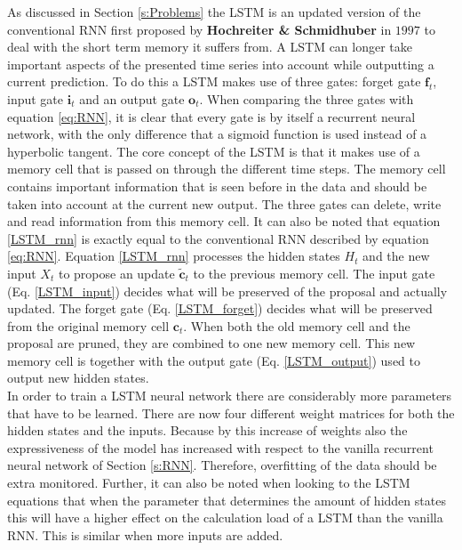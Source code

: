 As discussed in Section \ref{s:Problems} the LSTM is an updated version of the conventional RNN first proposed by \textbf{Hochreiter \& Schmidhuber} in $ 1997 $ to deal with the short term memory it suffers from. A LSTM can longer take important aspects of the presented time series into account while outputting a current prediction. To do this a LSTM makes use of three gates: forget gate $ \textbf{f}_t $, input gate $ \textbf{i}_t $ and an output gate $ \textbf{o}_t $. When comparing the three gates with equation \ref{eq:RNN}, it is clear that every gate is by itself a recurrent neural network, with the only difference that a sigmoid function is used instead of a hyperbolic tangent. The core concept of the LSTM is that it makes use of a memory cell that is passed on through the different time steps. The memory cell contains important information that is seen before in the data and should be taken into account at the current new output. The three gates can delete, write and read information from this memory cell. It can also be noted that equation \ref{LSTM_rnn} is exactly equal to the conventional RNN described by equation \ref{eq:RNN}. Equation \ref{LSTM_rnn} processes the hidden states $ H_t $ and the new input $ X_t $ to propose an update $ \tilde{\textbf{c}}_t $ to the previous memory cell. The input gate (Eq. \ref{LSTM_input}) decides what will be preserved of the proposal and actually updated. The forget gate (Eq. \ref{LSTM_forget}) decides what will be preserved from the original memory cell $ \textbf{c}_t $. When both the old memory cell and the proposal are pruned, they are combined to one new memory cell. This new memory cell is together with the output gate (Eq. \ref{LSTM_output}) used to output new hidden states. \\

In order to train a LSTM neural network there are considerably more parameters that have to be learned. There are now four different weight matrices for both the hidden states and the inputs. Because by this increase of weights also the expressiveness of the model has increased with respect to the vanilla recurrent neural network of Section \ref{s:RNN}. Therefore, overfitting of the data should be extra monitored. Further, it can also be noted when looking to the LSTM equations that when the parameter that determines the amount of hidden states this will have a higher effect on the calculation load of a LSTM than the vanilla RNN. This is similar when more inputs are added.



